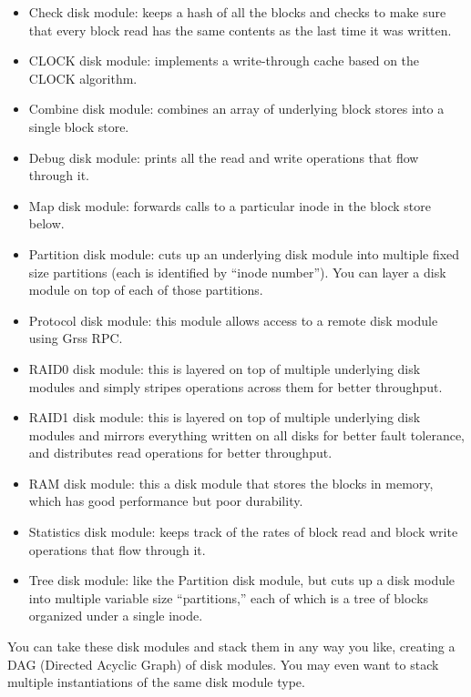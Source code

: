 \documentclass{article}
\begin{document}
\begin{itemize}
\item Check disk module: keeps a hash of all the blocks and checks to make sure that every block read has the same contents as the last time it was written.
\item CLOCK disk module: implements a write-through cache based on the CLOCK algorithm.
\item Combine disk module: combines an array of underlying block stores into a single block store.
\item Debug disk module: prints all the read and write operations that flow through it.
\item Map disk module: forwards calls to a particular inode in the block store below.
\item Partition disk module: cuts up an underlying disk module into multiple fixed size partitions (each is identified by ``inode number'').  You can layer a disk module on top of each of those partitions.
\item Protocol disk module: this module allows access to a remote disk module using Grss RPC.
\item RAID0 disk module: this is layered on top of multiple underlying disk modules and simply stripes operations across them for better throughput.
\item RAID1 disk module: this is layered on top of multiple underlying disk modules and mirrors everything written on all disks for better fault tolerance, and distributes read operations for better throughput.
\item RAM disk module: this a disk module that stores the blocks in memory, which has good performance but poor durability.
\item Statistics disk module: keeps track of the rates of block read and block write operations that flow through it.
\item Tree disk module: like the Partition disk module, but cuts up a disk module into multiple variable size ``partitions,'' each of which is a tree of blocks organized under a single inode.
\end{itemize}

You can take these disk modules and stack them in any way you like,
creating a DAG (Directed Acyclic Graph) of disk modules.  You may
even want to stack multiple instantiations of the same disk module type.
\end{document}
